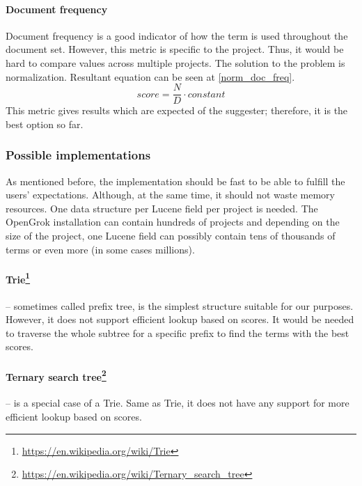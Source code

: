 \paragraph{Document frequency}
Document frequency is a good indicator of how the term is used throughout the document set. However,
this metric is specific to the project. Thus, it would be hard to compare values across multiple projects. The solution
to the problem is normalization. Resultant equation can be seen at \ref{norm_doc_freq}.
\begin{equation}
\label{norm_doc_freq}
score = \frac{N}{D} \cdot constant
\end{equation}
This metric gives results which are expected of the suggester; therefore, it is the best option so far.


\subsubsection{Possible implementations}
\label{possible_implementations}
As mentioned before, the implementation should be fast to be able to fulfill the users' expectations. Although, at the
same time, it should not waste memory resources. One data structure per Lucene field per project is needed. The OpenGrok
installation can contain hundreds of projects and depending on the size of the project, one Lucene field can possibly contain
tens of thousands of terms or even more (in some cases millions).

\paragraph{Trie\protect\footnote{\url{https://en.wikipedia.org/wiki/Trie}}} – sometimes called prefix tree, is the simplest
structure suitable for our purposes. However, it does not support efficient lookup based on scores. It would
be needed to traverse the whole subtree for a specific prefix to find the terms with the best scores.

\paragraph{Ternary search tree\protect\footnote{\url{https://en.wikipedia.org/wiki/Ternary\_search\_tree}}} – is a
special case of a Trie. Same as Trie, it does not have any support for more efficient lookup based on scores.

